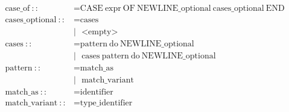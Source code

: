 \documentclass{article}
\begin{document}
\begin{align*}
  \text{case\_of}\ ::                 & = \text{CASE}\ \text{expr}\ \text{OF}\ \text{NEWLINE\_optional}\ \text{cases\_optional}\ \text{END}                                                                                                                       \\
  \text{cases\_optional}\ ::          & = \text{cases}                                                                                                                                                                                                            \\
                                      & |\ \ \ \text{<empty>}                                                                                                                                                                                                     \\
  \text{cases}\ ::                    & = \text{pattern}\ \text{do}\ \text{NEWLINE\_optional}                                                                                                                                                                     \\
                                      & |\ \ \ \text{cases}\ \text{pattern}\ \text{do}\ \text{NEWLINE\_optional}                                                                                                                                                  \\
  \text{pattern}\ ::                  & = \text{match\_as}                                                                                                                                                                                                        \\
                                      & |\ \ \ \text{match\_variant}                                                                                                                                                                                              \\
  \text{match\_as}\ ::                & = \text{identifier}                                                                                                                                                                                                       \\
  \text{match\_variant}\ ::           & = \text{type\_identifier}                                                                                                                                                                                                 \\

\end{align*}
\end{document}
